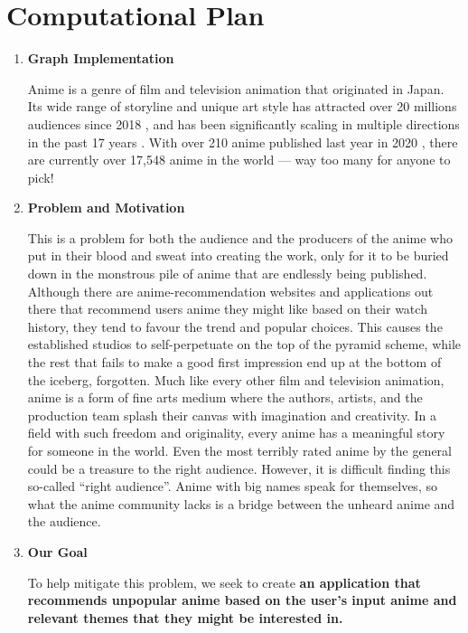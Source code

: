 \documentclass[fontsize=11pt]{article}
\begin{document}
\section*{Computational Plan}

\begin{enumerate}
    \item \textbf{Graph Implementation}
    
    \quad \quad Anime is a genre of film and television animation that originated in Japan. Its wide range of storyline and unique art style has attracted over 20 millions audiences since 2018 \citep{Ani18}, and has been significantly scaling in multiple directions in the past 17 years \citep{Ell18}. With over 210 anime published last year in 2020 \citep{wiki21}, there are currently over 17,548 anime in the world \citep{MyA21} — way too many for anyone to pick!
    
    \item \textbf{Problem and Motivation}
    
    \quad This is a problem for both the audience and the producers of the anime who put in their blood and sweat into creating the work, only for it to be buried down in the monstrous pile of anime that are endlessly being published. Although there are anime-recommendation websites and applications out there that recommend users anime they might like based on their watch history, they tend to favour the trend and popular choices. This causes the established studios to self-perpetuate on the top of the pyramid scheme, while the rest that fails to make a good first impression end up at the bottom of the iceberg, forgotten. Much like every other film and television animation, anime is a form of fine arts medium where the authors, artists, and the production team splash their canvas with imagination and creativity. In a field with such freedom and originality, every anime has a meaningful story for someone in the world. Even the most terribly rated anime by the general could be a treasure to the right audience. However, it is difficult finding this so-called “right audience”. Anime with big names speak for themselves, so what the anime community lacks is a bridge between the unheard anime and the audience.
    
    \item \textbf{Our Goal}
    
    \quad To help mitigate this problem, we seek to create \textbf{an application that recommends unpopular anime based on the user’s input anime and relevant themes that they might be interested in.}
\end{enumerate}
\end{document}
